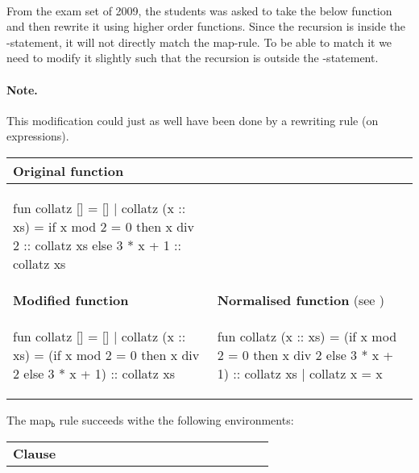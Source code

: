 \begin{example}\
  \label{ex:map-instance-collatz}\\
  From the exam set of 2009, the students was asked to take the below
  function and then rewrite it using higher order functions. Since the recursion
  is inside the \ttt{if}-statement, it will not directly match the
  \textsf{map}-rule. To be able to match it we need to modify it slightly such
  that the recursion is outside the \ttt{if}-statement.

  \paragraph{Note.} This modification could just as well have been done by
  a rewriting rule (on expressions).
  \begin{center}
    \begin{tabular}{|l|l|}
      \hline
      \textbf{Original function}
      &
      \\ \hline
      \begin{sml}
fun collatz [] = []
  | collatz (x :: xs) =
      if x mod 2 = 0 then
        x div 2 :: collatz xs
      else
        3 * x + 1 :: collatz xs
      \end{sml}
      &
      \\ \hline
      \textbf{Modified function}
      &
      \textbf{Normalised function}
      \footnotesize{(see \fref{tr:trace-normalise-collatz})}
      \\ \hline
      \begin{sml}
fun collatz [] = []
  | collatz (x :: xs) =
      (if x mod 2 = 0 then
       x div 2 else 3 * x + 1)
      :: collatz xs
      \end{sml}
      &
      \begin{sml}
fun collatz (x :: xs) =
      (if x mod 2 = 0 then
       x div 2 else 3 * x + 1)
      :: collatz xs
  | collatz x = x
      \end{sml}
      \\ \hline
    \end{tabular}
  \end{center}
  The \textsf{map$_\textsf{b}$} rule succeeds withe the following environments:
  \begin{center}
    \begin{tabular}{c | Mr @{} Ml Mr @{} Ml Mr @{} Ml !{\hspace{3em}} Mr @{} Ml}
      \textbf{Clause}

\end{tabular}
\end{center}
\end{example}
